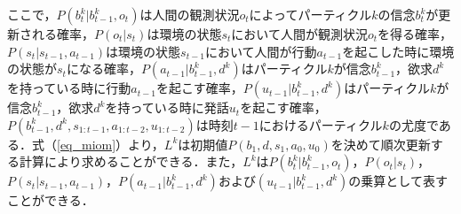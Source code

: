 ここで，$P(b_t^k|b_{t-1}^k,o_t)$は人間の観測状況$o_t$によってパーティクル$k$の信念$b_t^k$が更新される確率，$P(o_t|s_t)$は環境の状態$s_t$において人間が観測状況$o_t$を得る確率，$P(s_t|s_{t-1},a_{t-1})$は環境の状態$s_{t-1}$において人間が行動$a_{t-1}$を起こした時に環境の状態が$s_{t}$になる確率，$P(a_{t-1}|b_{t-1}^k,d^k)$はパーティクル$k$が信念$b_{t-1}^k$，欲求$d^k$を持っている時に行動$a_{t-1}$を起こす確率，$P(u_{t-1}|b_{t-1}^k,d^k)$はパーティクル$k$が信念$b_{t-1}^k$，欲求$d^k$を持っている時に発話$u_t$を起こす確率，$P(b_{t-1}^k,d^k,s_{1:t-1},a_{1:t-2},u_{1:t-2})$は時刻$t-1$におけるパーティクル$k$の尤度である．式（\ref{eq_miom}）より，$L^k$は初期値$P(b_1,d,s_1,a_0,u_0)$を決めて順次更新する計算により求めることができる．また，$L^k$は$P(b_t^k|b_{t-1}^k,o_t)$，$P(o_t|s_t)$，$P(s_t|s_{t-1},a_{t-1})$，$P(a_{t-1}|b_{t-1}^k,d^k)$および$(u_{t-1}|b_{t-1}^k,d^k)$の乗算として表すことができる．

